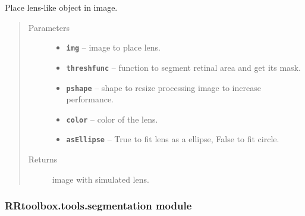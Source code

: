 \documentclass[letterpaper,10pt,english]{sphinxmanual}
\begin{document}
\begin{fulllineitems}
\label{RRtoolbox.tools:RRtoolbox.tools.lens.simulateLens}
Place lens-like object in image.
\begin{quote}\begin{description}
\item[{Parameters}] \leavevmode\begin{itemize}
\item {} 
\textbf{\texttt{img}} -- image to place lens.

\item {} 
\textbf{\texttt{threshfunc}} -- function to segment retinal area and get its mask.

\item {} 
\textbf{\texttt{pshape}} -- shape to resize processing image to increase performance.

\item {} 
\textbf{\texttt{color}} -- color of the lens.

\item {} 
\textbf{\texttt{asEllipse}} -- True to fit lens as a ellipse, False to fit circle.

\end{itemize}

\item[{Returns}] \leavevmode
image with simulated lens.

\end{description}\end{quote}

\end{fulllineitems}



\subsubsection{RRtoolbox.tools.segmentation module}
\label{RRtoolbox.tools:rrtoolbox-tools-segmentation-module}\label{RRtoolbox.tools:module-RRtoolbox.tools.segmentation}
\end{document}
